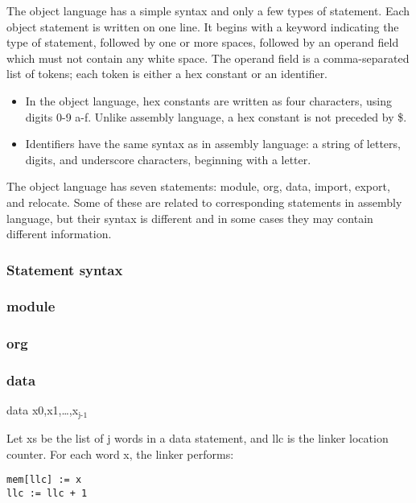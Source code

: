 \documentclass[11pt]{article}
\begin{document}
The object language has a simple syntax and only a few types of
statement.  Each object statement is written on one line.  It begins
with a keyword indicating the type of statement, followed by one or
more spaces, followed by an operand field which must not contain any
white space.  The operand field is a comma-separated list of tokens;
each token is either a hex constant or an identifier.

\begin{itemize}
\item In the object language, hex constants are written as four
characters, using digits 0-9 a-f.  Unlike assembly language, a hex
constant is not preceded by \$.

\item Identifiers have the same syntax as in assembly language: a string
of letters, digits, and underscore characters, beginning with a
letter.
\end{itemize}

The object language has seven statements: module, org, data, import,
export, and relocate.  Some of these are related to corresponding
statements in assembly language, but their syntax is different and in
some cases they may contain different information.

\subsubsection*{Statement syntax}
\label{sec:org08b0b8e}
\subsubsection*{module}
\label{sec:org9d95e2f}

\subsubsection*{org}
\label{sec:orge8a73be}

\subsubsection*{data}
\label{sec:orge8df839}

data x0,x1,\ldots{},x\(_{\text{j-1}}\)

Let xs be the list of j words in a data statement, and llc is the linker
location counter.  For each word x, the linker performs:

\begin{verbatim}
mem[llc] := x
llc := llc + 1
\end{verbatim}
\end{document}
